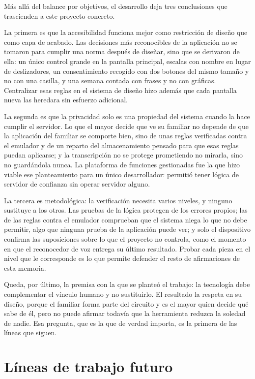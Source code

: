 Más allá del balance por objetivos, el desarrollo deja tres conclusiones que trascienden a este proyecto
concreto.

La primera es que la accesibilidad funciona mejor como restricción de diseño que como capa de acabado.
Las decisiones más reconocibles de la aplicación no se tomaron para cumplir una norma después de diseñar,
sino que se derivaron de ella: un único control grande en la pantalla principal, escalas con nombre en lugar
de deslizadores, un consentimiento recogido con dos botones del mismo tamaño y no con una casilla, y una
semana contada con frases y no con gráficas. Centralizar esas reglas en el sistema de diseño hizo además que
cada pantalla nueva las heredara sin esfuerzo adicional.

La segunda es que la privacidad solo es una propiedad del sistema cuando la hace cumplir el servidor. Lo que
el mayor decide que ve su familiar no depende de que la aplicación del familiar se comporte bien, sino de
unas reglas verificadas contra el emulador y de un reparto del almacenamiento pensado para que esas reglas
puedan aplicarse; y la transcripción no se protege prometiendo no mirarla, sino no guardándola nunca. La
plataforma de funciones gestionadas fue la que hizo viable ese planteamiento para un único desarrollador:
permitió tener lógica de servidor de confianza sin operar servidor alguno.

La tercera es metodológica: la verificación necesita varios niveles, y ninguno sustituye a los otros. Las
pruebas de la lógica protegen de los errores propios; las de las reglas contra el emulador comprueban que el
sistema niega lo que no debe permitir, algo que ninguna prueba de la aplicación puede ver; y solo el
dispositivo confirma las suposiciones sobre lo que el proyecto no controla, como el momento en que el
reconocedor de voz entrega su último resultado. Probar cada pieza en el nivel que le corresponde es lo que
permite defender el resto de afirmaciones de esta memoria.

Queda, por último, la premisa con la que se planteó el trabajo: la tecnología debe complementar el vínculo
humano y no sustituirlo. El resultado la respeta en su diseño, porque el familiar forma parte del circuito
y es el mayor quien decide qué sabe de él, pero no puede afirmar todavía que la herramienta reduzca la
soledad de nadie. Esa pregunta, que es la que de verdad importa, es la primera de las líneas que siguen.

\section{Líneas de trabajo futuro}
\label{sec:lineas-futuras}

